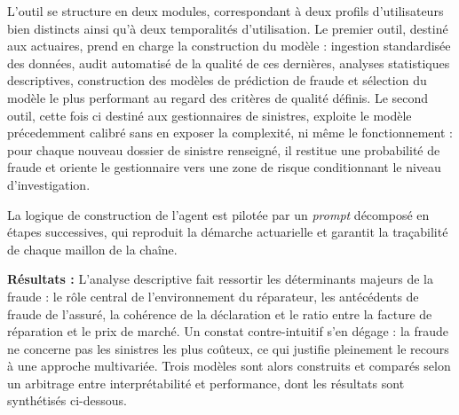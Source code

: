 L'outil se structure en deux modules, correspondant à deux profils d'utilisateurs bien distincts ainsi qu'à deux temporalités d'utilisation. Le premier outil, destiné aux actuaires, prend en charge la construction du modèle : ingestion standardisée des données, audit automatisé de la qualité de ces dernières, analyses statistiques descriptives, construction des modèles de prédiction de fraude et sélection du modèle le plus performant au regard des critères de qualité définis. Le second outil, cette fois ci destiné aux gestionnaires de sinistres, exploite le modèle précedemment calibré sans en exposer la complexité, ni même le fonctionnement : pour chaque nouveau dossier de sinistre renseigné, il restitue une probabilité de fraude et oriente le gestionnaire vers une zone de risque conditionnant le niveau d'investigation.

La logique de construction de l'agent est pilotée par un \textit{prompt} décomposé en étapes successives, qui reproduit la démarche actuarielle et garantit la traçabilité de chaque maillon de la chaîne.

\noindent\textbf{Résultats :} L'analyse descriptive fait ressortir les déterminants majeurs de la fraude : le rôle central de l'environnement du réparateur, les antécédents de fraude de l'assuré, la cohérence de la déclaration et le ratio entre la facture de réparation et le prix de marché. Un constat contre-intuitif s'en dégage : la fraude ne concerne pas les sinistres les plus coûteux, ce qui justifie pleinement le recours à une approche multivariée. Trois modèles sont alors construits et comparés selon un arbitrage entre interprétabilité et performance, dont les résultats sont synthétisés ci-dessous.

